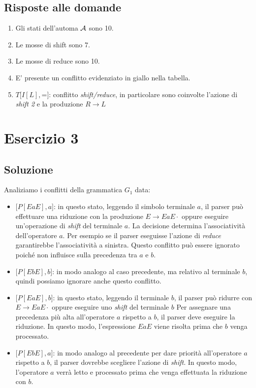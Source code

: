 \documentclass[11pt]{article}
\begin{document}
\subsection{Risposte alle domande}

\begin{enumerate}
  \item Gli stati dell'automa $\cal A$ sono 10.
  \item Le mosse di shift sono 7.
  \item Le mosse di reduce sono 10.
  \item E' presente un conflitto evidenziato in giallo nella tabella.
  \item $T\big[I[L], $=$\big]$: conflitto \textit{shift/reduce}, in particolare 
  sono coinvolte l'azione di \textit{shift 2} e la produzione $R\rightarrow L$
\end{enumerate}

\section{Esercizio 3}
\subsection{Soluzione}
Analiziamo i conflitti della grammatica $G_1$ data:
\begin{itemize}
  \item $\big[P[EaE], a\big]$: in questo stato, leggendo il simbolo terminale $a$, il parser può
effettuare una riduzione con la produzione $E \rightarrow EaE\cdot$ oppure eseguire 
un'operazione di \textit{shift} del terminale $a$.
La decisione determina l'associatività dell'operatore $a$. Per esempio se il parser 
eseguisse l'azione di \textit{reduce} garantirebbe l'associatività a sinistra. Questo 
conflitto può essere ignorato poiché non influisce sulla precedenza tra $a$ e $b$.
  
\item $\big[P[EbE], b\big]$: in modo analogo al caso precedente, ma relativo al terminale $b$, quindi possiamo ignorare anche questo conflitto.
    
\item $\big[P[EaE], b\big]$: in questo stato, leggendo il terminale $b$, il parser può ridurre 
con $E \rightarrow EaE\cdot$ oppure eseguire uno \textit{shift} del terminale $b$
Per assegnare una precedenza più alta all'operatore $a$ rispetto a $b$, il parser deve 
eseguire la riduzione. In questo modo, l'espressione $EaE$ viene risolta prima che 
$b$ venga processato.
  
\item $\big[P[EbE], a\big]$: in modo analogo al precedente per dare priorità 
all'operatore $a$ rispetto a $b$, il parser dovrebbe scegliere l'azione di \textit{shift}. 
In questo modo, l'operatore $a$ verrà letto e processato prima che venga effettuata la riduzione con $b$.
\end{itemize}
\end{document}
